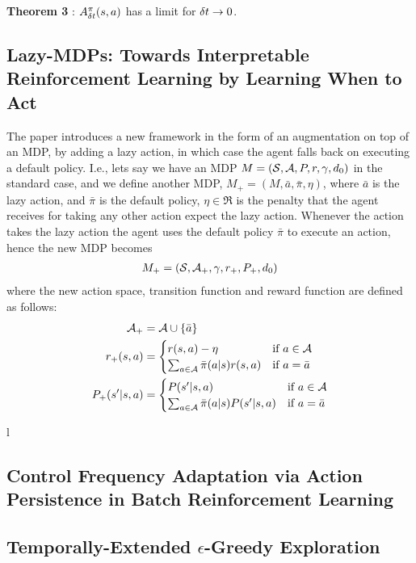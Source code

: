 \documentclass[11pt]{article}
\begin{document}
\textbf{Theorem 3} : $A^\pi_{\delta t} (s,a)$ has a limit for ${\delta t} \rightarrow 0 $.


\subsection{Lazy-MDPs: Towards Interpretable Reinforcement Learning by Learning When to Act}
\cite{jacq2022lazy}
The paper introduces a new framework in the form of an augmentation on top of an MDP, by adding a lazy action, in which case the agent falls back on executing a default policy.
I.e., lets say we have an MDP $M = ({\mathcal{S}}, {\mathcal{A}}, P, r, \gamma, d_0)$ in the standard case, and we define another MDP, $M_+= (M, \bar{a}, \bar{\pi}, \eta)$, where $\bar{a}$ is the lazy action, and $\bar{\pi}$
 is the default policy, $\eta \in \Re$ is the penalty that the agent receives for taking any other action expect the lazy action. Whenever the action takes the lazy action the agent uses the default policy $\bar{\pi}$ to execute an action, hence the new MDP becomes
 \begin{align*}
     M_+ = ({\mathcal{S}}, {\mathcal{A}}_+, \gamma, r_+, P_+, d_0)
 \end{align*}
 where the new action space, transition function and reward function are defined as follows:
 \begin{align*}
     {\mathcal{A}}_+ &= {\mathcal{A}} \cup \{\bar{a}\}\\
     r_+ (s,a) &=   
     \begin{cases} 
    r(s,a) - \eta & \text{if } a \in {\mathcal{A}} \\
    \sum_{a\in{\mathcal{A}}} \bar{\pi}(a|s) r(s,a) & \text{if } a = \bar{a}
  \end{cases}\\
  P_+ (s'| s,a) &=   
     \begin{cases} 
    P(s'|s,a) & \text{if } a \in {\mathcal{A}} \\
    \sum_{a\in{\mathcal{A}}} \bar{\pi}(a|s) P(s'|s,a) & \text{if } a = \bar{a}
  \end{cases}\\
 \end{align*}
 
l
 
 
 \subsection{Control Frequency Adaptation via Action Persistence in Batch Reinforcement Learning}
\cite{metelli2020control}
\subsection{Temporally-Extended {$\epsilon$}-Greedy Exploration}
\end{document}

